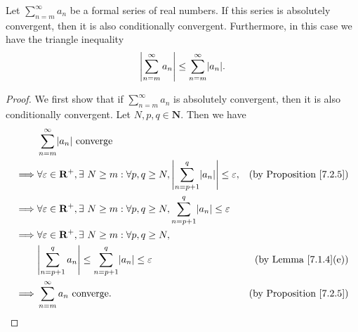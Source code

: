 \begin{proposition}\label{7.2.9}
    Let \(\sum_{n = m}^\infty a_n\) be a formal series of real numbers.
    If this series is absolutely convergent, then it is also conditionally convergent.
    Furthermore, in this case we have the triangle inequality
    \[
        \abs*{\sum_{n = m}^\infty a_n} \leq \sum_{n = m}^\infty \abs*{a_n}.
    \]
\end{proposition}

\begin{proof}
    We first show that if \(\sum_{n = m}^\infty a_n\) is absolutely convergent, then it is also conditionally convergent.
    Let \(N, p, q \in \mathbf{N}\).
    Then we have
    \begin{align*}
                 & \sum_{n = m}^\infty \abs*{a_n} \text{ converge}                                                                                                                             \\
        \implies & \forall \varepsilon \in \mathbf{R}^+, \exists\ N \geq m : \forall p, q \geq N, \abs*{\sum_{n = p + 1}^q \abs*{a_n}} \leq \varepsilon, & \text{(by Proposition \ref{7.2.5})} \\
        \implies & \forall \varepsilon \in \mathbf{R}^+, \exists\ N \geq m : \forall p, q \geq N, \sum_{n = p + 1}^q \abs*{a_n} \leq \varepsilon                                               \\
        \implies & \forall \varepsilon \in \mathbf{R}^+, \exists\ N \geq m : \forall p, q \geq N,                                                                                              \\
                 & \abs*{\sum_{n = p + 1}^q a_n} \leq \sum_{n = p + 1}^q \abs*{a_n} \leq \varepsilon                                                     & \text{(by Lemma \ref{7.1.4}(e))}    \\
        \implies & \sum_{n = m}^\infty a_n \text{ converge}.                                                                                             & \text{(by Proposition \ref{7.2.5})}
    \end{align*}


\end{proof}
